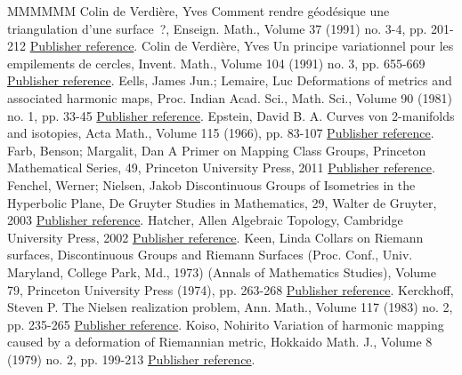 \documentclass[11pt]{article}
\theoremstyle{definition}
\numberwithin{equation}{section}
\begin{document}
\begin{thebibliography}{MMMMMM}
 Colin de Verdière, Yves Comment rendre géodésique une triangulation d’une surface ?, Enseign. Math., Volume 37 (1991) no. 3-4, pp. 201-212 \href{https://ahl.centre-mersenne.org/item/AHL_2021__4__1767_0/#ColindeVerdiereComment}{Publisher reference}.
 Colin de Verdière, Yves Un principe variationnel pour les empilements de cercles, Invent. Math., Volume 104 (1991) no. 3, pp. 655-669 \href{https://ahl.centre-mersenne.org/item/AHL_2021__4__1767_0/#ColindeVerdiere}{Publisher reference}.
 Eells, James Jun.; Lemaire, Luc Deformations of metrics and associated harmonic maps, Proc. Indian Acad. Sci., Math. Sci., Volume 90 (1981) no. 1, pp. 33-45 \href{https://ahl.centre-mersenne.org/item/AHL_2021__4__1767_0/#EL}{Publisher reference}.
 Epstein, David B. A. Curves von 2-manifolds and isotopies, Acta Math., Volume 115 (1966), pp. 83-107 \href{https://ahl.centre-mersenne.org/item/AHL_2021__4__1767_0/#Epstein-isotopies}{Publisher reference}.
 Farb, Benson; Margalit, Dan A Primer on Mapping Class Groups, Princeton Mathematical Series, 49, Princeton University Press, 2011 \href{https://ahl.centre-mersenne.org/item/AHL_2021__4__1767_0/#FarbMargalit}{Publisher reference}.
 Fenchel, Werner; Nielsen, Jakob Discontinuous Groups of Isometries in the Hyperbolic Plane, De Gruyter Studies in Mathematics, 29, Walter de Gruyter, 2003 \href{https://ahl.centre-mersenne.org/item/AHL_2021__4__1767_0/#FenchelNielsenBook}{Publisher reference}.
 Hatcher, Allen Algebraic Topology, Cambridge University Press, 2002 \href{https://ahl.centre-mersenne.org/item/AHL_2021__4__1767_0/#Hatcher}{Publisher reference}.
 Keen, Linda Collars on Riemann surfaces, Discontinuous Groups and Riemann Surfaces (Proc. Conf., Univ. Maryland, College Park, Md., 1973) (Annals of Mathematics Studies), Volume 79, Princeton University Press (1974), pp. 263-268 \href{https://ahl.centre-mersenne.org/item/AHL_2021__4__1767_0/#Keen}{Publisher reference}.
 Kerckhoff, Steven P. The Nielsen realization problem, Ann. Math., Volume 117 (1983) no. 2, pp. 235-265 \href{https://ahl.centre-mersenne.org/item/AHL_2021__4__1767_0/#KerckhoffNielsen}{Publisher reference}.
 Koiso, Nohirito Variation of harmonic mapping caused by a deformation of Riemannian metric, Hokkaido Math. J., Volume 8 (1979) no. 2, pp. 199-213 \href{https://ahl.centre-mersenne.org/item/AHL_2021__4__1767_0/#Koiso}{Publisher reference}.

\end{thebibliography}
\end{document}
